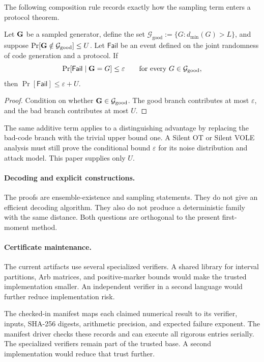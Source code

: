The following composition rule records exactly how the sampling term enters a
protocol theorem.

\begin{proposition}
\label{prop:application-composition}
Let $\mathbf G$ be a sampled generator, define the set
$\mathcal G_{\mathrm{good}}:=\{G:d_{\min}(G)>L\}$, and suppose
$\Pr[\mathbf G\notin\mathcal G_{\mathrm{good}}]\leq U$.  Let $\mathsf{Fail}$ be an event defined on
the joint randomness of code generation and a protocol.  If
\begin{equation}
 \Pr[\mathsf{Fail}\mid\mathbf G=G]\leq\varepsilon
 \qquad\text{for every }G\in\mathcal G_{\mathrm{good}},
\end{equation}
then $\Pr[\mathsf{Fail}]\leq\varepsilon+U$.
\end{proposition}

\begin{proof}
Condition on whether $\mathbf G\in\mathcal G_{\mathrm{good}}$.  The good branch
contributes at most $\varepsilon$, and the bad branch contributes at most
$U$.
\end{proof}

The same additive term applies to a distinguishing advantage by replacing
the bad-code branch with the trivial upper bound one.  A Silent OT or Silent
VOLE analysis must still prove the conditional bound $\varepsilon$ for its
noise distribution and attack model.  This paper supplies only $U$.

\paragraph{Decoding and explicit constructions.}
The proofs are ensemble-existence and sampling statements.  They do not give
an efficient decoding algorithm.  They also do not produce a deterministic
family with the same distance.  Both questions are orthogonal to the present
first-moment method.

\paragraph{Certificate maintenance.}
The current artifacts use several specialized verifiers.  A shared library
for interval partitions, Arb matrices, and positive-marker bounds would make
the trusted implementation smaller.  An independent verifier in a second
language would further reduce implementation risk.

The checked-in manifest maps each claimed numerical result to its verifier,
inputs, SHA-256 digests, arithmetic precision, and expected failure exponent.
The manifest driver checks these records and can execute all rigorous entries
serially.  The specialized verifiers remain part of the trusted base.  A
second implementation would reduce that trust further.

